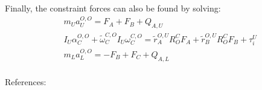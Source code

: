 Finally, the constraint forces can also be found by solving:
\begin{equation}
\begin{aligned}
&m_U a_U^{O,O} = F_A + F_B +Q_{A,U} \\
&I_U \alpha_C^{O,O}+\tilde{\omega}_C^{C,O} I_U \omega_C^{C,O} = \tilde{r}_A^{O,U}R^C_OF_A+\tilde{r}_B^{O,U}R^C_O F_B+\tau_i^U\\
&m_L a_L^{O,O} = -F_B + F_C +Q_{A,L} \\
\end{aligned}
\end{equation}




References: \cite{Schilder2018} \cite{Hibbeler2013}